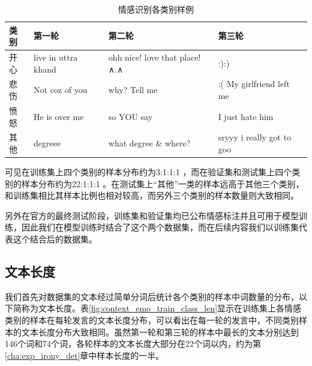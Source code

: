 \begin{table}[htb]
  \centering
  \begin{minipage}[t]{\linewidth}
  \caption{情感识别各类别样例}
  \label{tab:semeval_2019_task3_sample}
    \begin{tabularx}{\linewidth}{l|XXX}
    \toprule[1.5pt]
    \small 类别 & 第一轮 & 第二轮 & 第三轮 \\
    \hline
    \small 开心 & live in uttra khand & ohh nice! love that place!∧.∧ & :):) \\
    \small 悲伤 & Not coz of you & why? Tell me & :( My girlfriend left me \\
    \small 愤怒 & He is over me & so YOU say & I just hate him \\  
    \small 其他 & degreee & what degree \& where? & sryyy i really got to goo\\
    \bottomrule[1.5pt]
    \end{tabularx}
  \end{minipage}
\end{table}

可见在训练集上四个类别的样本分布约为3:1:1:1 ，而在验证集和测试集上四个类别的样本分布约为22:1:1:1 。在测试集上“其他”一类的样本远高于其他三个类别，和训练集相比其样本比例也相对较高，而另外三个类别的样本数量则大致相同。

另外在官方的最终测试阶段，训练集和验证集均已公布情感标注并且可用于模型训练，因此我们在模型训练时结合了这个两个数据集，而在后续内容我们以训练集代表这个结合后的数据集。

\subsection{文本长度}

我们首先对数据集的文本经过简单分词后统计各个类别的样本中词数量的分布，以下简称为文本长度。表\ref{fig:context_emo_train_class_len}显示在训练集上各情感类别的样本在每轮发言的文本长度分布，可以看出在每一轮的发言中，不同类别样本的文本长度分布大致相同。虽然第一轮和第三轮的样本中最长的文本分别达到146个词和74个词，各轮样本的文本长度大部分在22个词以内，约为第\ref{cha:exp_irony_det}章中样本长度的一半。

